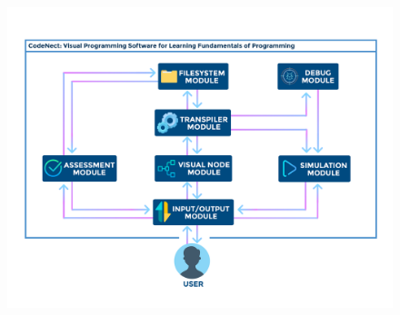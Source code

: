 \begin{doublespace}
\begin{center}
		\clearpage
		\null\vfill
		\begin{figure}[H]
			\centering
			\includegraphics[width=\textwidth]{figures/theoretical_framework.png}
			\caption{}
			\label{fig:theoretical_framework}
		\end{figure}
		\vfill

	\end{center}
\end{doublespace}
